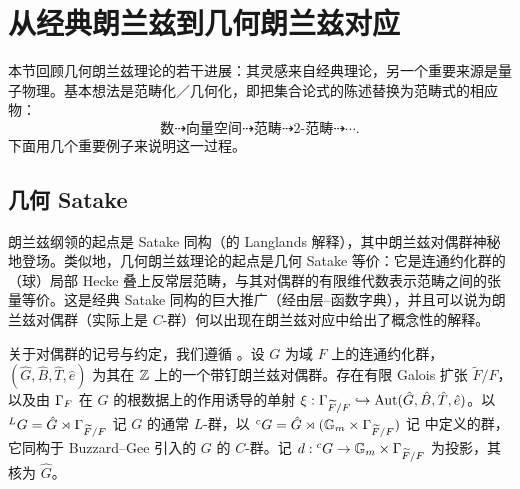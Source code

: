 
\section{从经典朗兰兹到几何朗兰兹对应}

本节回顾几何朗兰兹理论的若干进展：其灵感来自经典理论，另一个重要来源是量子物理。基本想法是范畴化／几何化，即把集合论式的陈述替换为范畴式的相应物：
\begin{equation}\label{categorification}
\text{数}\dashrightarrow\text{向量空间}\dashrightarrow\text{范畴}\dashrightarrow\text{2-范畴}\dashrightarrow\cdots .
\end{equation}
下面用几个重要例子来说明这一过程。

\subsection{几何 Satake}\label{S: geometric Satake}

朗兰兹纲领的起点是 Satake 同构（的 Langlands 解释），其中朗兰兹对偶群神秘地登场。类似地，几何朗兰兹理论的起点是几何 Satake 等价：它是连通约化群的（球）局部 Hecke 叠上反常层范畴，与其对偶群的有限维代数表示范畴之间的张量等价。这是经典 Satake 同构的巨大推广（经由层--函数字典），并且可以说为朗兰兹对偶群（实际上是 $C$-群）何以出现在朗兰兹对应中给出了概念性的解释。

关于对偶群的记号与约定，我们遵循 \cite[Sect.~1.1]{Zhu-Integral-Satake}。设 $G$ 为域 $F$ 上的连通约化群，$(\hat G,\hat B,\hat T,\hat e)$ 为其在 ${\mathbb Z}$ 上的一个带钉朗兰兹对偶群。存在有限 Galois 扩张 $\widetilde F/F$，以及由 ${\Gamma}_F$ 在 $G$ 的根数据上的作用诱导的单射 $\xi:{\Gamma}_{\widetilde F/F}\hookrightarrow{\operatorname{Aut}}(\hat G,\hat B,\hat T,\hat e)$。以 ${}^LG=\hat G\rtimes{\Gamma}_{\widetilde F/F}$ 记 $G$ 的通常 $L$-群，以 ${}^cG=\hat G\rtimes({\mathbb G}_m\times{\Gamma}_{\widetilde F/F})$ 记 \cite{Zhu-Integral-Satake} 中定义的群，它同构于 Buzzard--Gee 引入的 $G$ 的 $C$-群。记 $d:{}^cG\to{\mathbb G}_m\times{\Gamma}_{\widetilde F/F}$ 为投影，其核为 $\hat G$。

